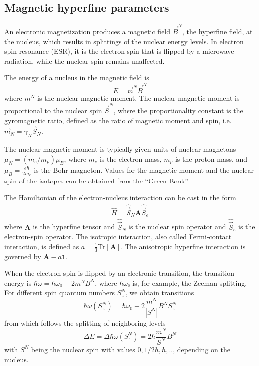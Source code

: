 \documentclass[final,12pt,makeidx,DIV=calc]{article}
\begin{document}
{{{{{{%
\subsection{Magnetic hyperfine parameters}
An electronic magnetization produces a magnetic field $\vec{B}^N$, the
hyperfine field, at the nucleus, which results in splittings of the
nuclear energy levels.  In electron spin resonance (ESR), it is the
electron spin that is flipped by a microwave radiation, while the
nuclear spin remains unaffected.

The energy of a nucleus in the magnetic field is
\begin{displaymath}
E=\vec{m}^N \vec{B}^N
\end{displaymath}
where $m^N$ is the nuclear magnetic moment. The nuclear magnetic
moment is proportional to the nuclear spin $\vec{S}^N$, where the
proportionality constant is the gyromagnetic ratio, defined as the ratio of magnetic moment and spin,
i.e. $\vec{m}_N=\gamma_N \vec{S}_N$.

The nuclear magnetic moment is typically given units of nuclear
magnetons $\mu_N=(m_e/m_p)\mu_B$, where $m_e$ is the electron mass,
$m_p$ is the proton mass, and $\mu_B=\frac{e\hbar}{2m_e}$ is the Bohr
magneton.  Values for the magnetic moment and the nuclear spin of the
isotopes can be obtained from the ``Green Book''\cite{greenbook}.

The Hamiltonian of the electron-nucleus interaction can be cast in the form
\begin{eqnarray*}
\hat{H}=\hat{\vec{S}}_N\mathbf{A}\hat{\vec{S}}_e
\end{eqnarray*}
where $\mathbf{A}$ is the hyperfine tensor and $\hat{\vec{S}}_N$ is
the nuclear spin operator and $\hat{\vec{S}}_e$ is the electron-spin
operator. The isotropic interaction, also called Fermi-contact
interaction, is defined as $a=\frac{1}{3}\textrm{Tr}[\mathbf{A}]$. The
anisotropic hyperfine interaction is governed by
$\mathbf{A}-a\mathbf{1}$.

When the electron spin is flipped by an electronic transition, the
transition energy is $\hbar\omega=\hbar\omega_0+2m^NB^N$, where
$\hbar\omega_0$ is, for example, the Zeeman splitting. For different
spin quantum numbers $S^N_z$, we obtain transitions
\begin{equation}
\hbar\omega(S^N_z)=\hbar\omega_0+2\frac{m^N}{|S^N|}B^N S^N_z
\end{equation}
from which follows the splitting of neighboring levels
\begin{equation}
\Delta E=\Delta \hbar\omega(S^N_z)=2\hbar\frac{m^N}{S^N}B^N 
\end{equation}
with $S^N$ being the nuclear spin with values $0,1/2\hbar,\hbar,..$,
depending on the nucleus.


}}}}}}
\end{document}
